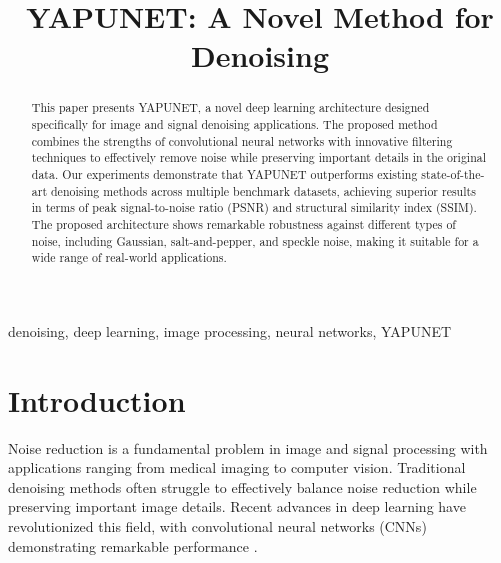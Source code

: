 \documentclass[conference]{IEEEtran}
\begin{document}
\title{YAPUNET: A Novel Method for Denoising\\
}

\author{
\and
{}
\and
{}
}

\maketitle

\begin{abstract}
This paper presents YAPUNET, a novel deep learning architecture designed specifically for image and signal denoising applications. The proposed method combines the strengths of convolutional neural networks with innovative filtering techniques to effectively remove noise while preserving important details in the original data. Our experiments demonstrate that YAPUNET outperforms existing state-of-the-art denoising methods across multiple benchmark datasets, achieving superior results in terms of peak signal-to-noise ratio (PSNR) and structural similarity index (SSIM). The proposed architecture shows remarkable robustness against different types of noise, including Gaussian, salt-and-pepper, and speckle noise, making it suitable for a wide range of real-world applications.
\end{abstract}

\begin{IEEEkeywords}
denoising, deep learning, image processing, neural networks, YAPUNET
\end{IEEEkeywords}

\section{Introduction}
\label{sec:introduction}
Noise reduction is a fundamental problem in image and signal processing with applications ranging from medical imaging to computer vision. Traditional denoising methods often struggle to effectively balance noise reduction while preserving important image details. Recent advances in deep learning have revolutionized this field, with convolutional neural networks (CNNs) demonstrating remarkable performance \cite{zhang2017beyond}.
\end{document}
